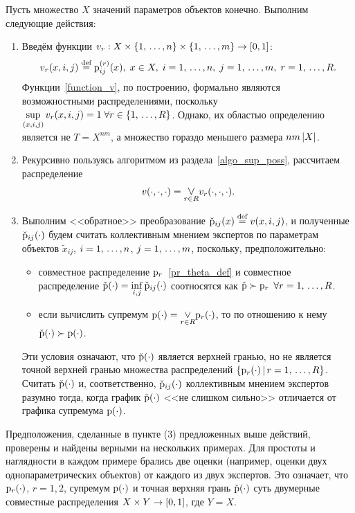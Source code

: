 Пусть множество $X$ значений параметров объектов конечно. Выполним следующие действия:
\begin{enumerate}
	\item Введём функции $v_r: X \times \{1,\, \ldots, n\} \times \{1,\, \ldots, m\} \rightarrow [0,1]$:
		  \begin{equation}
		      \label{function_v}
		      v_r(x, i, j) \overset{\text{def}}{=} {\mathrm{p}}_{ij}^{(r)}(x),\; x \in X, \; i = 1,\, \ldots, n,\; j = 1,\, \ldots, m,\; r = 1,\, \ldots, R.
		  \end{equation}
		  Функции~\eqref{function_v}, по построению, формально являются возможностными распределениями, поскольку $  \underset{(x,i,j)} \sup \,v_r(x,i,j) = 1\; \forall r \in \{1,\, \ldots, R\}$. Однако, их областью определению является не $T = X^{nm}$, а множество гораздо меньшего размера $nm\left| X \right|$.
	\item Рекурсивно пользуясь алгоритмом из раздела~\ref{algo_sup_poss}, рассчитаем распределение 
	\begin{equation*}	
	      v(\cdot,\cdot,\cdot) = \underset{r \in R} {\mathlarger \vee}  v_r(\cdot,\cdot,\cdot).
	\end{equation*}	
	\item Выполним <<обратное>> преобразование $\check{{\mathrm{p}}}_{ij}(x) \overset{\text{def}}{=} v(x, i,j)$, и полученные $\check{{\mathrm{p}}}_{ij}(\cdot)$ будем  считать коллективным мнением экспертов по параметрам объектов $\tilde x_{ij}$, $i = 1,\, \ldots, n$, $j = 1,\, \ldots, m$, поскольку, предположительно: 
	\begin{itemize}
	    \item
	    совместное распределение ${\mathrm{p}}_r$~\eqref{pr_theta_def} %
	    и совместное распределение $\check{{\mathrm{p}}}(\cdot) = \underset{i,j}\inf\, \check{{\mathrm{p}}}_{ij}(\cdot)$ соотносятся как $\check{{\mathrm{p}}} \succ {\mathrm{p}}_r$  $\forall r = 1,\, \ldots, R$. 
	    \item если вычислить супремум $\p(\cdot) = \underset{r \in R} {\mathlarger \vee}  \p_r(\cdot)$, то по отношению к нему $\check{{\mathrm{p}}}(\cdot) \succ {\mathrm{p}}(\cdot)$.  
	\end{itemize}
	Эти условия означают, что $\check{{\mathrm{p}}}(\cdot)$ является верхней гранью, но не является точной верхней гранью множества распределений $\{{\mathrm{p}}_r(\cdot) \,|\, r = 1,\, \ldots, R \}$. Считать $\check{{\mathrm{p}}}(\cdot)$ и, соответственно, $\check{{\mathrm{p}}}_{ij}(\cdot)$ коллективным мнением экспертов разумно тогда, когда график $\check{{\mathrm{p}}}(\cdot)$ <<не слишком сильно>> отличается от графика супремума ${\mathrm{p}}(\cdot)$.
\end{enumerate}	

Предположения, сделанные в пункте (3) предложенных выше действий, проверены и найдены верными на нескольких примерах. Для простоты и наглядности в каждом примере брались две оценки (например, оценки двух однопараметрических объектов) от каждого из двух экспертов. Это означает, что ${\mathrm{p}}_r(\cdot)$, $r = 1,2$, супремум ${\mathrm{p}}(\cdot)$ и точная верхняя грань $\check{{\mathrm{p}}}(\cdot)$ суть двумерные совместные распределения $X \times Y \rightarrow [0,1]$, где $Y = X$. 

